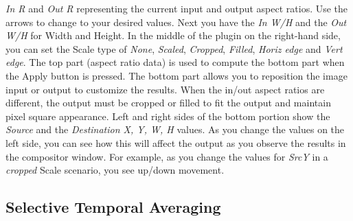 \textit{In R} and \textit{Out R} representing the current input and output aspect ratios. Use the arrows to change to your desired values. Next you have the \textit{In W/H} and the \textit{Out W/H} for Width and Height. In the middle of the plugin on the right-hand side, you can set the Scale type of \textit{None}, \textit{Scaled}, \textit{Cropped}, \textit{Filled}, \textit{Horiz edge} and \textit{Vert edge}. The top part (aspect ratio data) is used to compute the bottom part when the Apply button is pressed. The bottom part allows you to reposition the image input or output to customize the results. When the in/out aspect ratios are different, the output must be cropped or filled to fit the output and maintain pixel square appearance. Left and right sides of the bottom portion show the \textit{Source} and the \textit{Destination X, Y, W, H} values. As you change the values on the left side, you can see how this will affect the output as you observe the results in the compositor window. For example, as you change the values for \textit{SrcY} in a \textit{cropped} Scale scenario, you see up/down movement.

\subsection{Selective Temporal Averaging}%
\label{sub:selective_temporal_averaging}

